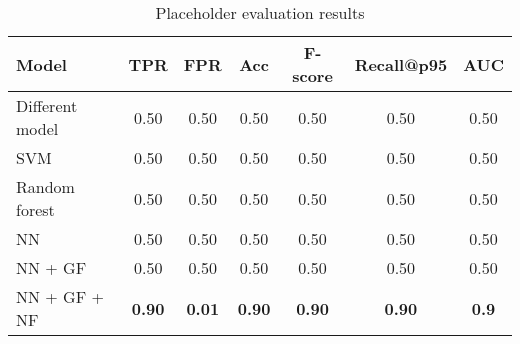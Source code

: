 \begin{table}[t]
\centering
\begin{tabular}{@{}lcccccc@{}}
\toprule
\textbf{Model}           & \textbf{TPR} & \textbf{FPR}  & \textbf{Acc} & \textbf{F-score} & \textbf{Recall@p95} & \textbf{AUC} \\ \midrule
Different model & 0.50 & 0.50  & 0.50 & 0.50     & 0.50        & 0.50 \\
SVM             & 0.50 & 0.50  & 0.50 & 0.50     & 0.50        & 0.50 \\
Random forest   & 0.50 & 0.50  & 0.50 & 0.50     & 0.50        & 0.50 \\
NN              & 0.50 & 0.50  & 0.50 & 0.50     & 0.50        & 0.50 \\
NN + GF         & 0.50 & 0.50  & 0.50 & 0.50     & 0.50        & 0.50 \\
NN + GF + NF    & \textbf{0.90} & \textbf{0.01} & \textbf{0.90} & \textbf{0.90}     & \textbf{0.90}        & \textbf{0.9} \\ \bottomrule
\end{tabular}
\caption{Placeholder evaluation results}
\label{tab:results}
\end{table}